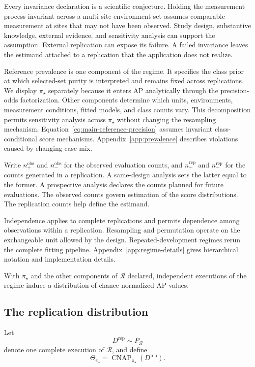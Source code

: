 \documentclass[11pt]{article}
\newcommand{\CNAP}{\operatorname{CNAP}}
\newcommand{\Regime}{\mathcal{R}}
\newcommand{\Tpi}{\CNAP_{\pi_\star}}
\theoremstyle{remark}
\begin{document}
Every invariance declaration is a scientific conjecture. Holding the measurement process invariant across a multi-site environment set assumes comparable measurement at sites that may not have been observed. Study design, substantive knowledge, external evidence, and sensitivity analysis can support the assumption. External replication can expose its failure. A failed invariance leaves the estimand attached to a replication that the application does not realize.

Reference prevalence is one component of the regime. It specifies the class prior at which selected-set purity is interpreted and remains fixed across replications. We display $\pi_\star$ separately because it enters AP analytically through the precision-odds factorization. Other components determine which units, environments, measurement conditions, fitted models, and class counts vary. This decomposition permits sensitivity analysis across $\pi_\star$ without changing the resampling mechanism. Equation~\eqref{eq:main-reference-precision} assumes invariant class-conditional score mechanisms. Appendix~\ref{app:prevalence} describes violations caused by changing case mix.

Write $n_+^{\mathrm{obs}}$ and $n_-^{\mathrm{obs}}$ for the observed evaluation counts, and $n_+^{\mathrm{rep}}$ and $n_-^{\mathrm{rep}}$ for the counts generated in a replication. A same-design analysis sets the latter equal to the former. A prospective analysis declares the counts planned for future evaluations. The observed counts govern estimation of the score distributions. The replication counts help define the estimand.

Independence applies to complete replications and permits dependence among observations within a replication. Resampling and permutation operate on the exchangeable unit allowed by the design. Repeated-development regimes rerun the complete fitting pipeline. Appendix~\ref{app:regime-details} gives hierarchical notation and implementation details.

With $\pi_\star$ and the other components of $\Regime$ declared, independent executions of the regime induce a distribution of chance-normalized AP values.

\subsection{The replication distribution}

Let
\[
D^{\mathrm{rep}}\sim P_{\Regime}
\]
denote one complete execution of $\Regime$, and define
\begin{equation}
\Theta_{\pi_\star}
=
\Tpi(D^{\mathrm{rep}}).
\label{eq:Theta}
\end{equation}
\end{document}
